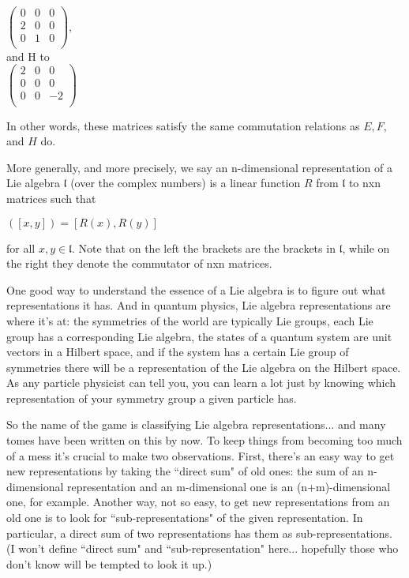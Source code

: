 \\
$\begin{pmatrix}
0 & 0 & 0 \\
2 & 0 & 0 \\
0 & 1 & 0 \\
\end{pmatrix}$,
\\

and H to
\\

$\begin{pmatrix}
2 & 0 & 0 \\  
0 & 0 & 0 \\
0 & 0 &-2\\
\end{pmatrix}$

In other words, these matrices satisfy the same commutation relations as $E,F$, and $H$ do.

More generally, and more precisely, we say an n-dimensional representation of a Lie algebra $\mathfrak{l}$ (over the complex numbers) is a linear function $R$ from $\mathfrak{l}$ to nxn matrices such that

$([x,y]) = [R(x),R(y)]$

for all $x,y \in \mathfrak{l}$. Note that on the left the brackets are the brackets in $\mathfrak{l}$, while on the right they denote the commutator of nxn matrices.

One good way to understand the essence of a Lie algebra is to figure out what representations it has. And in quantum physics, Lie algebra representations are where it's at: the symmetries of the world are typically Lie groups, each Lie group has a corresponding Lie algebra, the states of a quantum system are unit vectors in a Hilbert space, and if the system has a certain Lie group of symmetries there will be a representation of the Lie algebra on the Hilbert space. As any particle physicist can tell you, you can learn a lot just by knowing which representation of your symmetry group a given particle has.

So the name of the game is classifying Lie algebra representations... and many tomes have been written on this by now. To keep things from becoming too much of a mess it's crucial to make two observations. First, there's an easy way to get new representations by taking the ``direct sum" of old ones: the sum of an n-dimensional representation and an m-dimensional one is an (n+m)-dimensional one, for example. Another way, not so easy, to get new representations from an old one is to look for ``sub-representations" of the given representation. In particular, a direct sum of two representations has them as sub-representations. (I won't define ``direct sum" and ``sub-representation" here... hopefully those who don't know will be tempted to look it up.)


